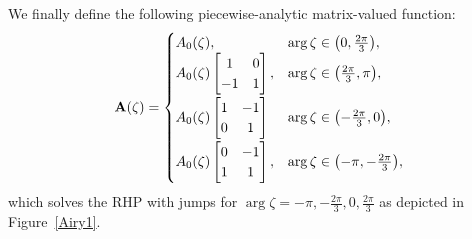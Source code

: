 \documentclass[10pt,a4paper]{amsart}
\numberwithin{equation}{section}
\theoremstyle{definition}
\begin{document}
We finally define the following piecewise-analytic matrix-valued function:{\samepage
\begin{gather}
		{\bf A} (\zeta) =
 \begin{cases}
 A_0(\zeta), & \operatorname{arg} \zeta\in\bigl(0,\frac{2\pi}{3}\bigr), \\
 A_0(\zeta)\begin{bmatrix}
 1 & 0 \\
 -1 & 1 \\
 \end{bmatrix}, & \operatorname{arg}\zeta\in\bigl(\frac{2\pi}{3},\pi\bigr), \\[10pt]
 A_0(\zeta)\begin{bmatrix}
 1 & -1\\
 0 & 1\\
 \end{bmatrix}
 & \operatorname{arg}\zeta\in\bigl(-\frac{2\pi}{3},0\bigr) , \\[10pt]
A_0(\zeta)\begin{bmatrix}
0 & -1 \\
 1 & 1\\
 \end{bmatrix}, & \operatorname{arg}\zeta\in\bigl(-\pi,-\frac{2\pi}{3}\bigr),
 \end{cases}\label{AiryParm}
\end{gather}
which solves the RHP with jumps for $\operatorname{arg} \zeta=-\pi,-\frac{2\pi}{3},0,\frac{2\pi}{3}$ as depicted in Figure~\ref{Airy1}.}
\end{document}
